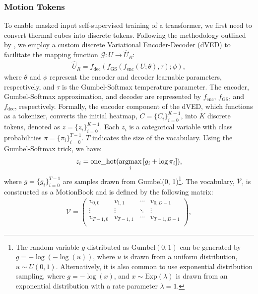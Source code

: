  
\subsubsection{Motion Tokens}\label{subsec:pose_token}
To enable masked input self-supervised training of a transformer, we first need to convert thermal cubes into discrete tokens. Following the methodology outlined by \cite{RameshZSdVAE, jang2017categorical}, we employ a custom discrete Variational Encoder-Decoder (dVED) to facilitate the mapping function \( \mathcal{G}: U \to \widehat{U}_{R} \):
\begin{align}
    \widehat{U}_{R} = f_{\text{dec}}(f_{\text{GS}}(f_{\text{enc}}(U; \theta), \tau); \phi),
\end{align}
where \( \theta \) and \( \phi \) represent the encoder and decoder learnable parameters, respectively, and \( \tau \) is the Gumbel-Softmax temperature parameter. The encoder, Gumbel-Softmax approximation, and decoder are represented by \( f_{\text{enc}} \), \( f_{\text{GS}} \), and \( f_{\text{dec}} \), respectively. 
Formally, the encoder component of the dVED, which functions as a tokenizer, converts the initial heatmap, \( C = \{C_i\}_{i=0}^{K-1} \), into \(K\) discrete tokens, denoted as \( z = \{z_i\}_{i=0}^{K-1} \). Each \(z_i\) is a categorical variable with class probabilities \( \pi = \{\pi_i\}_{i=0}^{T-1} \). \( T \) indicates the size of the vocabulary. Using the Gumbel-Softmax trick, we have: 
\begin{align}
    z_i = \text{one\_hot}(\operatorname*{argmax}_i{[g_i + \log\pi_i]}),
\end{align}
where \( g = \{g_i\}_{i=0}^{T-1} \) are samples drawn from Gumbel(0, 1)\footnote{The random variable \( g \) distributed as \( \text{Gumbel}(0, 1) \) can be generated by \( g = -\log(-\log(u)) \), where \( u \) is drawn from a uniform distribution, \( u \sim U(0, 1) \). Alternatively, it is also common to use exponential distribution sampling, where \( g = -\log(x) \), and \( x \sim \text{Exp}(\lambda) \) is drawn from an exponential distribution with a rate parameter \( \lambda = 1 \).}. 
The vocabulary, \(\mathcal{V}\), is constructed as a MotionBook and is defined by the following matrix:
\begin{align}
\mathcal{V} = 
\begin{pmatrix}
v_{0,0} & v_{1,1} & \cdots & v_{0,D-1} \\
\vdots & \vdots & \ddots & \vdots \\
v_{T-1,0} & v_{T-1,1} & \cdots & v_{T-1,D-1} \\
\end{pmatrix},
\end{align}
